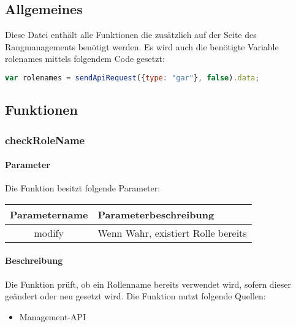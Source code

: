 \subsection{Allgemeines} Diese Datei enthält alle Funktionen die zusätzlich auf der Seite des Rangmanagements benötigt werden.
Es wird auch die benötigte Variable {\glqq rolenames\grqq} mittels folgendem Code gesetzt:
\begin{lstlisting}[language=JavaScript]
var rolenames = sendApiRequest({type: "gar"}, false).data;
\end{lstlisting}
\subsection{Funktionen}
\subsubsection{checkRoleName}
\paragraph{Parameter} Die Funktion besitzt folgende Parameter:
\begin{table}[H]
	\begin{tabular}{|c|p{11cm}|}
		\hline
		\textbf{Parametername} & \textbf{Parameterbeschreibung} \\ \hline
		modify & Wenn Wahr, existiert Rolle bereits \\ \hline
	\end{tabular}
\end{table}
\paragraph{Beschreibung} Die Funktion prüft, ob ein Rollenname bereits verwendet wird, sofern dieser geändert oder neu gesetzt wird. Die Funktion nutzt folgende Quellen:
\begin{itemize}
	\item Management-API
\end{itemize}